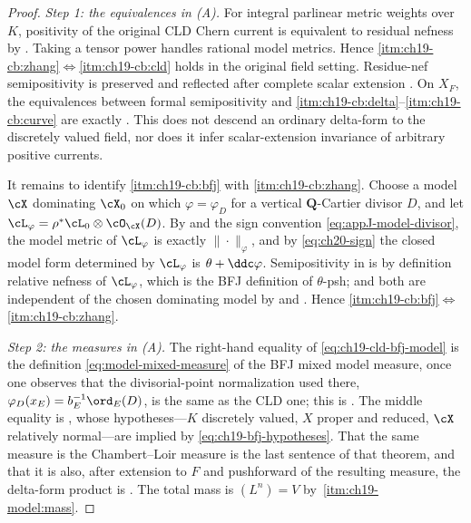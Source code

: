 \begin{proof}
\emph{Step 1: the equivalences in (A).}  For integral parlinear
metric weights over $K$, positivity of the original CLD Chern current is
equivalent to residual nefness by .
Taking a tensor power handles rational model metrics.  Hence
\cref{itm:ch19-cb:zhang}$\Leftrightarrow$\cref{itm:ch19-cb:cld} holds
in the original field setting.  Residue-nef semipositivity is preserved and
reflected after complete scalar extension
\cite[Proposition~7.6\,(2')]{GJR26}.  On $X_F$, the equivalences between
formal semipositivity and \cref{itm:ch19-cb:delta}--\cref{itm:ch19-cb:curve}
are exactly .  This does not
descend an ordinary delta-form to the discretely valued field, nor does
it infer scalar-extension invariance of arbitrary positive currents.

It remains to identify \cref{itm:ch19-cb:bfj} with
\cref{itm:ch19-cb:zhang}.  Choose a model $\cX$ dominating $\cX_0$ on which
$\varphi=\varphi_D$ for a vertical $\mathbf Q$-Cartier divisor $D$, and let
$\cL_\varphi=\rho^*\cL_0\otimes\cO_{\cX}(D)$.  By
 and the sign convention
\eqref{eq:appJ-model-divisor}, the model metric of $\cL_\varphi$ is exactly
$\|\cdot\|_\varphi$, and by \eqref{eq:ch20-sign} the closed model form
determined by $\cL_\varphi$ is $\theta+\ddc\varphi$.  Semipositivity in
 is by definition relative nefness of
$\cL_\varphi$, which is the BFJ definition of $\theta$-psh; and both are
independent of the chosen dominating model by
 and .  Hence
\cref{itm:ch19-cb:bfj}$\Leftrightarrow$\cref{itm:ch19-cb:zhang}.

\emph{Step 2: the measures in (A).}  The right-hand equality of
\eqref{eq:ch19-cld-bfj-model} is the definition
\eqref{eq:model-mixed-measure} of the BFJ mixed model measure, once one
observes that the divisorial-point normalization used there,
$\varphi_D(x_E)=b_E^{-1}\ord_E(D)$, is the same as the CLD one; this is
.  The middle equality is
, whose hypotheses---$K$ discretely valued, $X$
proper and reduced, $\cX$ relatively normal---are implied by
\eqref{eq:ch19-bfj-hypotheses}.  That the same measure is the
Chambert--Loir measure is the last sentence of that theorem, and that it is
also, after extension to $F$ and pushforward of the resulting measure,
the delta-form product is .  The total
mass is $(L^n)=V$ by \,\cref{itm:ch19-model:mass}.


\end{proof}
